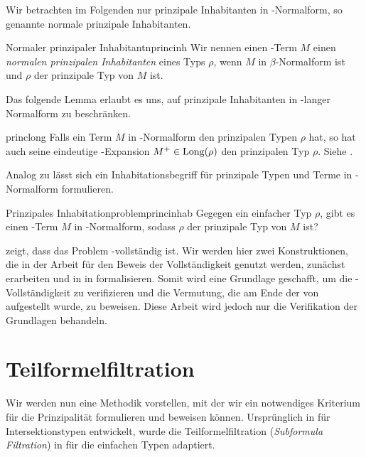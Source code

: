 Wir betrachten im Folgenden nur prinzipale Inhabitanten in \tbeta-Normalform, so genannte normale prinzipale Inhabitanten.

\begin{definition}{Normaler prinzipaler Inhabitant}{nprincinh}
    Wir nennen einen \tlambda-Term $M$ einen \emph{normalen prinzipalen Inhabitanten} eines Typs $\rho$, wenn $M$ in $\beta$-Normalform ist und $\rho$ der prinzipale Typ von $M$ ist.
\end{definition}

Das folgende Lemma erlaubt es uns, auf prinzipale Inhabitanten in \teta-langer Normalform zu beschränken.
\begin{lemma}{\cite[8A11.2]{Hindley2008}}{princlong}
    Falls ein Term $M$ in \tbeta-Normalform den prinzipalen Typen $\rho$ hat, so hat auch seine eindeutige \teta-Expansion $M^+\in\text{Long}(\rho)$ den prinzipalen Typ $\rho$.
    \Proof
    Siehe \cite[8A11.2]{Hindley2008}.
\end{lemma}

Analog zu  lässt sich ein Inhabitationsbegriff für prinzipale Typen und Terme in \tbeta-Normalform formulieren.

\begin{definition}{Prinzipales Inhabitationproblem}{princinhab}
    Gegegen ein einfacher Typ $\rho$, gibt es einen \tlambda-Term $M$ in \tbeta-Normalform, sodass $\rho$ der prinzipale Typ von $M$ ist?
\end{definition}

\cite{dudenhefner} zeigt, dass das Problem \PSPACE-vollständig ist. Wir werden hier zwei Konstruktionen, die in der Arbeit für den Beweis der Vollständigkeit genutzt werden, zunächst erarbeiten und in  in \coq{} formalisieren. Somit wird eine Grundlage geschafft, um die \PSPACE-Vollständigkeit zu verifizieren und die Vermutung, die am Ende der von \cite{dudenhefner} aufgestellt wurde, zu beweisen. Diese Arbeit wird jedoch nur die Verifikation der Grundlagen behandeln.

\section{Teilformelfiltration}
\label{sec:filtr}
Wir werden nun eine Methodik vorstellen, mit der wir ein notwendiges Kriterium für die Prinzipalität formulieren und beweisen können. Ursprünglich in \cite{duden2} für Intersektionstypen entwickelt, wurde die Teilformelfiltration (\emph{Subformula Filtration}) in \cite{dudenhefner} für die einfachen Typen adaptiert. 


